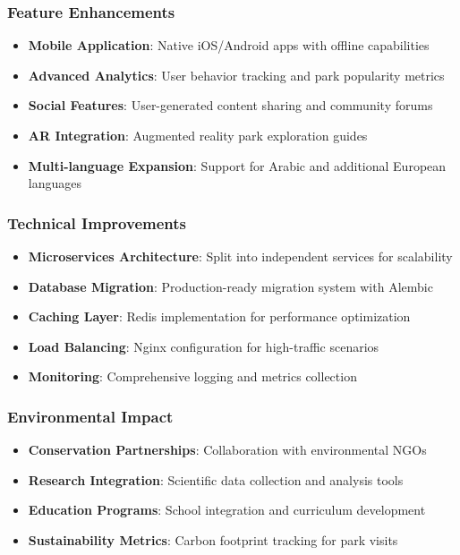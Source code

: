 \documentclass[11pt,a4paper]{article}
\begin{document}
\subsubsection{Feature Enhancements}
\begin{itemize}
    \item \textbf{Mobile Application}: Native iOS/Android apps with offline capabilities
    \item \textbf{Advanced Analytics}: User behavior tracking and park popularity metrics
    \item \textbf{Social Features}: User-generated content sharing and community forums
    \item \textbf{AR Integration}: Augmented reality park exploration guides
    \item \textbf{Multi-language Expansion}: Support for Arabic and additional European languages
\end{itemize}

\subsubsection{Technical Improvements}
\begin{itemize}
    \item \textbf{Microservices Architecture}: Split into independent services for scalability
    \item \textbf{Database Migration}: Production-ready migration system with Alembic
    \item \textbf{Caching Layer}: Redis implementation for performance optimization
    \item \textbf{Load Balancing}: Nginx configuration for high-traffic scenarios
    \item \textbf{Monitoring}: Comprehensive logging and metrics collection
\end{itemize}

\subsubsection{Environmental Impact}
\begin{itemize}
    \item \textbf{Conservation Partnerships}: Collaboration with environmental NGOs
    \item \textbf{Research Integration}: Scientific data collection and analysis tools
    \item \textbf{Education Programs}: School integration and curriculum development
    \item \textbf{Sustainability Metrics}: Carbon footprint tracking for park visits
\end{itemize}
\end{document}
